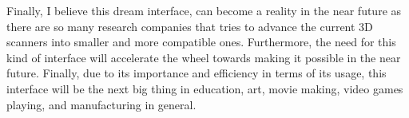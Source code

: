 \documentclass[12pt, oneside]{amsart}   	%
\begin{document}
Finally, I believe this dream interface, can become a reality in the near future as there are so many research companies that tries to advance the current 3D scanners into smaller and more compatible ones.  Furthermore, the need for this kind of interface will accelerate the wheel towards making it possible in the near future. Finally, due to its importance and efficiency in terms of its usage, this interface will be the next big thing in education, art, movie making, video games playing, and manufacturing in general.
\end{document}
